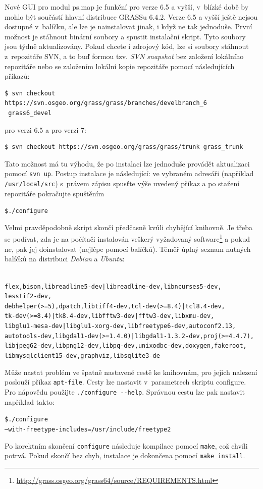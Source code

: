 \documentclass[a4paper,12pt,draft]{article}
\begin{document}
Nové GUI pro modul ps.map je funkční pro verze 6.5
a vyšší, v~blízké době by mohlo být součástí hlavní distribuce GRASSu 6.4.2.
Verze 6.5 a vyšší ještě nejsou dostupné v~balíčku, ale lze je nainstalovat
jinak,
i když ne tak jednoduše. První možnost je stáhnout binární soubory  a
spustit instalační skript. Tyto soubory jsou týdně aktualizovány. Pokud
chcete i zdrojový kód, lze si soubory stáhnout z~repozitáře SVN, a to buď
formou tzv. \emph{SVN snapshot} bez založení lokálního repozitáře nebo
se založením lokální kopie repozitáře pomocí následujících příkazů:
\begin{footnotesize}
\begin{verbatim}
$ svn checkout https://svn.osgeo.org/grass/grass/branches/develbranch_6
 grass6_devel
\end{verbatim}
\end{footnotesize}
pro verzi 6.5 a pro verzi 7:
\begin{footnotesize}
\begin{verbatim}
$ svn checkout https://svn.osgeo.org/grass/grass/trunk grass_trunk
\end{verbatim}
\end{footnotesize}
Tato možnost má tu výhodu, že po instalaci lze jednoduše provádět
aktualizaci pomocí \verb|svn up|. Postup instalace je následující: ve
vybraném adresáři (například \verb|/usr/local/src|) s~právem zápisu
spusťte výše uvedený příkaz a po stažení repozitáře pokračujte
spuštěním
\begin{alltt}
{\footnotesize \$ ./configure}
\end{alltt}
Velmi pravděpodobně skript skončí předčasně
kvůli chybějící knihovně. Je třeba se podívat,
zda je na počítači instalován veškerý vyžadovaný
software\footnote{\url{http://grass.osgeo.org/grass64/source/REQUIREMENTS.html}}
a pokud ne, pak jej doinstalovat (nejlépe pomocí balíčků). Téměř
úplný seznam nutných balíčků na distribuci \emph{Debian} a \emph{Ubuntu}:
\begin{alltt}
{\footnotesize
flex, bison, libreadline5-dev | libreadline-dev, libncurses5-dev,
lesstif2-dev,
debhelper (>= 5), dpatch, libtiff4-dev, tcl-dev (>= 8.4) | tcl8.4-dev,
tk-dev (>= 8.4) | tk8.4-dev, libfftw3-dev|fftw3-dev, libxmu-dev,
libglu1-mesa-dev | libglu1-xorg-dev, libfreetype6-dev, autoconf2.13,
autotools-dev, libgdal1-dev (>=1.4.0) | libgdal1-1.3.2-dev, proj (>= 4.4.7),
libjpeg62-dev, libpng12-dev, libpq-dev, unixodbc-dev, doxygen, fakeroot,
libmysqlclient15-dev, graphviz, libsqlite3-de
}
\end{alltt}
Může nastat problém ve špatně nastavené cestě ke knihovnám, pro
jejich nalezení poslouží příkaz \verb|apt-file|. Cesty lze nastavit
v~parametrech skriptu configure.
Pro nápovědu použijte \verb|./configure --help|.
Správnou cestu lze pak nastavit například takto:
\begin{alltt}
{\footnotesize \$ ./configure
--with-freetype-includes=/usr/include/freetype2
}
\end{alltt}
Po korektním skončení \verb|configure| následuje kompilace pomocí
\verb|make|, což chvíli potrvá. Pokud skončí bez chyb, instalace je
dokončena pomocí \verb|make install|.
\end{document}

